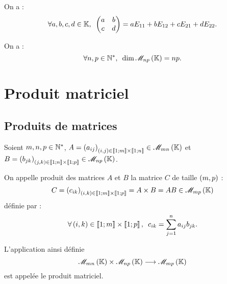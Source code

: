 \begin{ex}
On a : \[\quantifs{\forall a,b,c,d\in\K}\begin{pmatrix}
a & b \\
c & d
\end{pmatrix}=a E_{11}+b E_{12}+c E_{21}+d E_{22}.\]
\end{ex}

\begin{cor}
On a : \[\quantifs{\forall n,p\in\Ns}\dim\M{np}=np.\]
\end{cor}

\section{Produit matriciel}

\subsection{Produits de matrices}

\begin{defi}
Soient \(m,n,p\in\mathbb{N}^*\), \(A=\paren{a_{ij}}_{\paren{i,j}\in\interventierii{1}{m}\times\interventierii{1}{n}}\in\M{mn}\) et \(B=\paren{b_{jk}}_{\paren{j,k}\in\interventierii{1}{n}\times\interventierii{1}{p}}\in\M{np}\).

On appelle produit des matrices \(A\) et \(B\) la matrice \(C\) de taille \(\left(m,p\right)\) : \[C=\paren{c_{ik}}_{\paren{i,k}\in\interventierii{1}{m}\times\interventierii{1}{p}}=A\times B=AB\in\M{mp}\] définie par : \[\quantifs{\forall\paren{i,k}\in\interventierii{1}{m}\times\interventierii{1}{p}}c_{ik}=\sum_{j=1}^na_{ij}b_{jk}.\]

L'application ainsi définie \[\M{mn}\times\M{np}\to\M{mp}\] est appelée le produit matriciel.
\end{defi}

